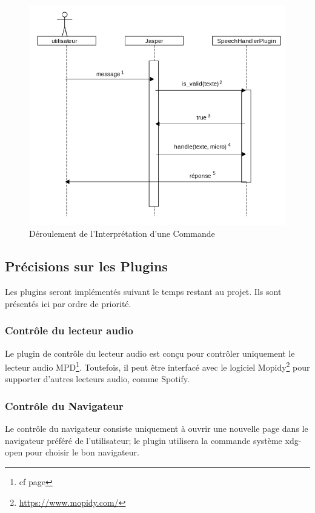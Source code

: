 \documentclass[12pt]{article}
\begin{document}
		\begin{figure}
			\centering
				\includegraphics[width=\textwidth]{sequence}
				\caption{\label{séquence} Déroulement de l'Interprétation d'une Commande}
		\end{figure}

		\subsection{Précisions sur les Plugins}
		Les plugins seront implémentés suivant le temps restant au projet. Ils sont présentés ici par ordre de priorité.
		
		\subsubsection{Contrôle du lecteur audio}
		Le plugin de contrôle du lecteur audio est conçu pour contrôler uniquement le lecteur audio MPD\footnote{cf page \pageref{mpd}}. Toutefois, il peut être interfacé avec le logiciel Mopidy\footnote{\url{https://www.mopidy.com/}} pour supporter d'autres lecteurs audio, comme Spotify.
		
		\subsubsection{Contrôle du Navigateur}
		Le contrôle du navigateur consiste uniquement à ouvrir une nouvelle page dans le navigateur préféré de l'utilisateur; le plugin utilisera la commande système xdg-open pour choisir le bon navigateur.
		
\end{document}
